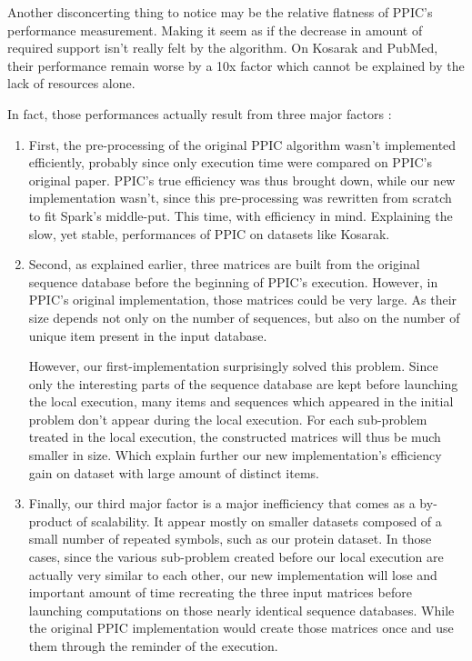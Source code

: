 \documentclass{eplmastersthesis}
\begin{document}
Another disconcerting thing to notice may be the relative flatness of PPIC's performance measurement. Making it seem as if the decrease in amount of required support isn't really felt by the algorithm. On Kosarak and PubMed, their performance remain worse by a 10x factor which cannot be explained by the lack of resources alone. \newline

In fact, those performances actually result from three major factors :

\begin{enumerate}
\item First, the pre-processing of the original PPIC algorithm wasn't implemented efficiently, probably since only execution time were compared on PPIC's original paper. PPIC's true efficiency was thus brought down, while our new implementation wasn't, since this pre-processing was rewritten from scratch to fit Spark's middle-put. This time, with efficiency in mind. Explaining the slow, yet stable, performances of PPIC on datasets like Kosarak.

\item Second, as explained earlier, three matrices are built from the original sequence database before the beginning of PPIC's execution. However, in PPIC's original implementation, those matrices could be very large. As their size depends not only on the number of sequences, but also on the number of unique item present in the input database. \newline
	
	However, our first-implementation surprisingly solved this problem. Since only the interesting parts of the sequence database are kept before launching the local execution, many items and sequences which appeared in the initial problem don't appear during the local execution. For each sub-problem treated in the local execution, the constructed matrices will thus be much smaller in size. Which explain further our new implementation's efficiency gain on dataset with large amount of distinct items.
	
\item Finally, our third major factor is a major inefficiency that comes as a by-product of scalability. It appear mostly on smaller datasets composed of a small number of repeated symbols, such as our protein dataset. In those cases, since the various sub-problem created before our local execution are actually very similar to each other, our new implementation will lose and important amount of time recreating the three input matrices before launching computations on those nearly identical sequence databases. While the original PPIC implementation would create those matrices once and use them through the reminder of the execution. \newline


\end{enumerate}
\end{document}
